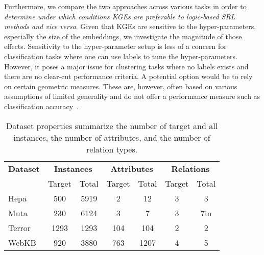 Furthermore, we compare the two approaches across various tasks in order to \textit{determine under which conditions KGEs are preferable to logic-based SRL methods and vice versa}.
Given that KGEs are sensitive to the hyper-parameters, especially the size of the embeddings, we investigate the magnitude of those effects.
Sensitivity to the hyper-parameter setup is less of a concern for classification tasks where one can use labels to tune the hyper-parameters. However, it poses a major issue for clustering tasks where no labels exists and there are no clear-cut performance criteria.
A potential option would be to rely on certain geometric measures. These are, however, often based on various assumptions of limited generality and do not offer a performance measure such as classification accuracy~\cite{Estivill-Castro:2002}.


\begin{table}[t]
	\centering
	
	\caption{Dataset properties summarize the number of target and all instances, the number of attributes, and the number of relation types.}
	\begin{tabular}{@{}lcccccc@{}}
		\toprule
		\textbf{Dataset} 	& \multicolumn{2}{c}{\textbf{Instances}} 		& \multicolumn{2}{c}{\textbf{Attributes}}	& \multicolumn{2}{c}{\textbf{Relations}} \\
							\cmidrule(rl){2-3} \cmidrule(lr){4-5} \cmidrule(l){6-7}
							& Target 				& Total					&   Target				& Total				& Target		& Total						\\
		\midrule
		Hepa				& 500					& 5919					& 2						& 12				& 3				& 3						\\
		Muta				& 230					& 6124					& 3						& 7					& 3				& 7in						\\
		Terror				& 1293					& 1293					& 104					& 104				& 2				& 2						\\
		WebKB				& 920					& 3880					& 763					& 1207				& 4				& 5						\\
		\bottomrule
	\end{tabular}
	\label{tab:properties}
\end{table}


